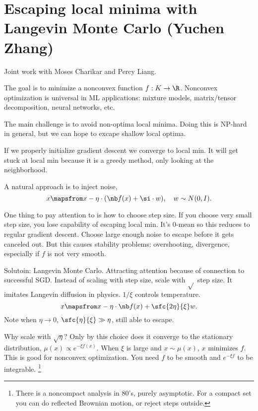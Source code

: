 
\section{Escaping local minima with Langevin Monte Carlo (Yuchen Zhang)}

Joint work with Moses Charikar and Percy Liang.

The goal is to minimize a nonconvex function $f:K\to \R$. Nonconvex optimization is universal in ML applications: mixture models, matrix/tensor decomposition, neural networks, etc.

The main challenge is to avoid non-optima local minima. Doing this is NP-hard in general, but we can hope to excape shallow local optima.

If we properly initialize gradient descent we converge to local min. It will get stuck at local min because it is a greedy method, only looking at the neighborhood.

A natural approach is to inject noise,
$$
x \mapsfrom x-\eta\cdot (\nb f(x) + \si\cdot w),\quad w\sim N(0,I).
$$

One thing to pay attention to is how to choose step size. If you choose very small step size, you lose capability of escaping local min. It's 0-mean so this reduces to regular gradient descent. Choose large enough noise to escape before it gets canceled out. But this causes stability problems: overshooting, divergence, especially if $f$ is not very smooth.

Solutoin: Langevin Monte Carlo. Attracting attention because of connection to successful SGD. Instead of scaling with step size, scale with $\sqrt{}$ step size. It imitates Langevin diffusion in physics. $1/\xi$ controls temperature.
$$
x\mapsfrom x -\eta\cdot \nb f(x) + \sfc{2\eta}{\xi} w.
$$
Note when $\eta\to 0$, $\sfc{\eta}{\xi}\gg \eta$, still able to escape.

Why scale with $\sqrt{\eta}$? Only by this choice does it converge to the stationary distribution, $\mu(x) \propto e^{-\xi f(x)}$. When $\xi$ is large and $x\sim \mu(x)$, $x$ minimizes $f$. 
This is good for nonconvex optimization.
You need $f$ to be smooth and $e^{-\xi f}$ to be integrable. %
\footnote{There is a noncompact analysis in 80's, purely asymptotic. For a compact set you can do reflected Brownian motion, or reject steps outside.} %


